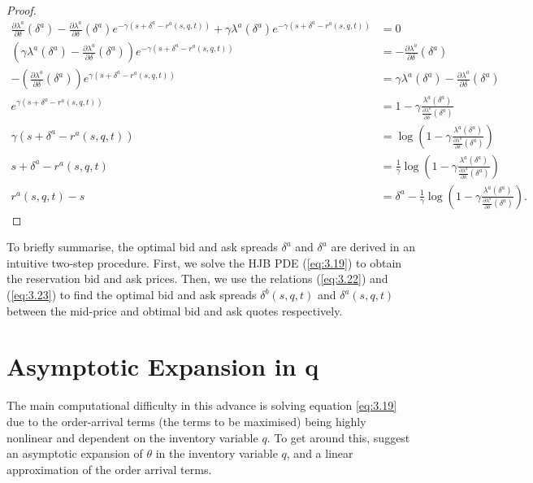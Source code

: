 \begin{proof}
\begin{align*}
        \frac{\partial\lambda^a}{\partial\delta}(\delta^a)-\frac{\partial\lambda^a}{\partial\delta}(\delta^a)e^{-\gamma(s+\delta^a-r^a(s,q,t))}+\gamma\lambda^a(\delta^a)e^{-\gamma(s+\delta^a-r^a(s,q,t))}&=0\\
        \left(\gamma\lambda^a(\delta^a)-\frac{\partial\lambda^a}{\partial\delta}(\delta^a)\right)e^{-\gamma(s+\delta^a-r^a(s,q,t))}&=-\frac{\partial\lambda^a}{\partial\delta}(\delta^a)\\
        -\left(\frac{\partial\lambda^a}{\partial\delta}(\delta^a)\right)e^{\gamma(s+\delta^a-r^a(s,q,t))}&=\gamma\lambda^a(\delta^a)-\frac{\partial\lambda^a}{\partial\delta}(\delta^a)\\
        e^{\gamma(s+\delta^a-r^a(s,q,t))}&=1-\gamma\frac{\lambda^a(\delta^a)}{\frac{\partial\lambda^a}{\partial\delta}(\delta^a)}\\
        \gamma(s+\delta^a-r^a(s,q,t))&=\log\left(1-\gamma\frac{\lambda^a(\delta^a)}{\frac{\partial\lambda^a}{\partial\delta}(\delta^a)}\right)\\
        s+\delta^a-r^a(s,q,t)&=\frac{1}{\gamma}\log\left(1-\gamma\frac{\lambda^a(\delta^a)}{\frac{\partial\lambda^a}{\partial\delta}(\delta^a)}\right)\\
        r^a(s,q,t)-s&=\delta^a-\frac{1}{\gamma}\log\left(1-\gamma\frac{\lambda^a(\delta^a)}{\frac{\partial\lambda^a}{\partial\delta}(\delta^a)}\right).
    \end{align*}
\end{proof}

To briefly summarise, the optimal bid and ask spreads $\delta^a$ and $\delta^a$ are
derived in an intuitive two-step procedure. First, we solve the HJB PDE (\ref{eq:3.19})
to obtain the reservation bid and ask prices. Then, we use the relations (\ref{eq:3.22})
and (\ref{eq:3.23}) to find the optimal bid and ask spreads $\delta^b(s,q,t)$ and 
$\delta^a(s,q,t)$ between the mid-price and obtimal bid and ask quotes respectively.

\section{Asymptotic Expansion in q}\label{sec:3.8}

The main computational difficulty in this advance is solving equation \ref{eq:3.19}
due to the order-arrival terms (the terms to be maximised) being highly nonlinear and
dependent on the inventory variable $q$. To get around this, \cite{AS2008} suggest
an asymptotic expansion of $\theta$ in the inventory variable $q$, and a linear 
approximation of the order arrival terms. 

